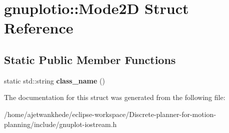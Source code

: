 \hypertarget{structgnuplotio_1_1Mode2D}{}\section{gnuplotio\+:\+:Mode2D Struct Reference}
\label{structgnuplotio_1_1Mode2D}
\subsection*{Static Public Member Functions}
\begin{DoxyCompactItemize}
\item 
\mbox{\label{structgnuplotio_1_1Mode2D_aaf35c9cd117de8bc5dbc2d5ec1224232}} 
static std\+::string {\bfseries class\+\_\+name} ()
\end{DoxyCompactItemize}


The documentation for this struct was generated from the following file\+:\begin{DoxyCompactItemize}
\item 
/home/ajetwankhede/eclipse-\/workspace/\+Discrete-\/planner-\/for-\/motion-\/planning/include/gnuplot-\/iostream.\+h\end{DoxyCompactItemize}
